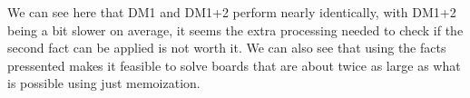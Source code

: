 \documentclass{article}
\begin{document}
We can see here that DM1 and DM1+2 perform nearly identically, with DM1+2 being a bit slower on average, it seems the extra processing needed to check if the second fact can be applied is not worth it. We can also see that using the facts pressented makes it feasible to solve boards that are about twice as large as what is possible using just memoization. 
\end{document}
